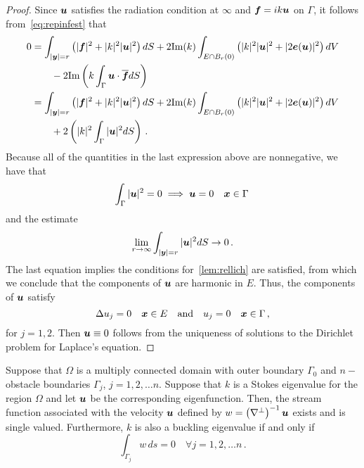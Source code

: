 \begin{proof}
Since ${\boldsymbol u}$ satisfies the radiation condition at $\infty$ and ${\boldsymbol f} = ik {\boldsymbol u}$
on $\Gamma$, it follows from~\cref{eq:repinfest} that
\begin{align}
0 &=
\int_{|{\boldsymbol y}|=r} \left( |{\boldsymbol f}|^2 + |k|^2 |{\boldsymbol u}|^2 \right) dS +
2 \text{Im}(k) \int_{E \cap B_{r}(0)} \left(|k|^2 |{\boldsymbol u}|^2 + |2{\boldsymbol e}({\boldsymbol u})|^2 \right)
dV \nonumber \\
& \qquad - 2 \text{Im} \left( k \int_{\Gamma} {\boldsymbol u} \cdot \overline{{\boldsymbol f}} dS  \right) \\
&= 
\int_{|{\boldsymbol y}|=r} \left( |{\boldsymbol f}|^2 + |k|^2 |{\boldsymbol u}|^2 \right) dS +
2 \text{Im}(k) \int_{E \cap B_{r}(0)} \left(|k|^2 |{\boldsymbol u}|^2 + |2{\boldsymbol e}({\boldsymbol u})|^2 \right)
dV \nonumber \\
& \qquad + 2 \left( |k|^{2} \int_{\Gamma} |{\boldsymbol u}|^{2} dS  \right)
\, .
\end{align}
Because all of the quantities in the last expression above are
nonnegative, we have that
\begin{equation}
\int_{\Gamma} |{\boldsymbol u}|^{2} = 0 \implies {\boldsymbol u} = 0  \quad {\boldsymbol x} \in \Gamma \, 
\end{equation}
and the estimate
\begin{equation}
\lim_{r\to\infty} \int_{|{\boldsymbol y}|=r} |{\boldsymbol u}|^{2} dS \to 0 \, .
\end{equation}
The last equation implies the conditions for~\cref{lem:rellich}
are satisfied, from which we conclude that the components
of ${\boldsymbol u}$ are harmonic in $E$. 
Thus, the components of ${\boldsymbol u}$ satisfy
\begin{equation}
\Delta u_{j}=  0 \quad {\boldsymbol x} \in E \quad \text{and} \quad
u_{j} = 0 \quad {\boldsymbol x} \in \Gamma \, ,
\end{equation}
for $j=1,2$.
Then ${\boldsymbol u} \equiv 0$ follows from the uniqueness of solutions to the 
Dirichlet problem for Laplace's equation.
\end{proof}

\begin{lem}
Suppose that $\Omega$ is a multiply connected domain with outer boundary
$\Gamma_{0}$ and $n-$ obstacle boundaries $\Gamma_{j}$, $j=1,2,\ldots n$. 
Suppose that $k$ is a Stokes eigenvalue for the region $\Omega$ and 
let ${\boldsymbol u}$ be the corresponding eigenfunction. 
Then, the stream function associated with the velocity ${\boldsymbol u}$ defined by
$w = \left(\nabla^{\perp} \right)^{-1} {\boldsymbol u}$ exists and is single valued. 
Furthermore, $k$ is also a buckling eigenvalue if and only if
\begin{equation}
\int_{\Gamma_{j}} w\, ds = 0 \quad \forall j=1,2,\ldots n \, .
\end{equation}
\end{lem}

